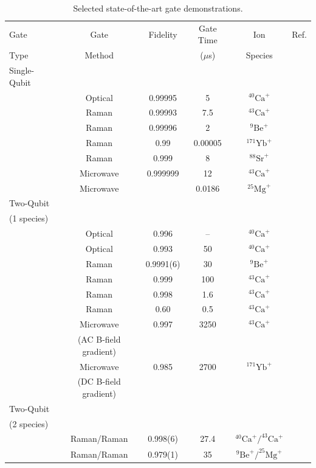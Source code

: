 \documentclass[%
reprint,
 amsmath,amssymb,
]{revtex4-1}
\begin{document}
\begin{table}
\caption{Selected state-of-the-art gate demonstrations.}
\renewcommand{\arraystretch}{1.15}
\begin{tabular}{l c c c c c}
\hline
\hline
Gate & Gate & Fidelity & Gate Time & Ion & Ref. \\
 Type & Method & & ($\mu$s) & Species \\
\hline

Single-Qubit & & &\\
 & Optical & 0.99995 & 5 &$^{40}\mathrm{Ca}^{+}$ & \cite{BermudezAssessing2017}\\
 & Raman & 0.99993  & 7.5  & $^{43}\mathrm{Ca}^{+}$ &\cite{Ballance2QubitHyperfineGate2016}\\
 & Raman & 0.99996  & 2  & $^{9}\mathrm{Be}^{+}$ & \cite{nist_gate_2016} \\
 & Raman & 0.99  & 0.00005  & $^{171}\mathrm{Yb}^{+}$ & \cite{CampbellUltrafast2010} \\
 & Raman & 0.999  & 8  & $^{88}\mathrm{Sr}^{+}$ & \cite{KeselmanZeemanQubit2011} \\
 & Microwave & 0.999999 & 12& $^{43}\mathrm{Ca}^{+}$ &\cite{HartyHighFidelityIons2014}\\
 & Microwave &  & 0.0186& $^{25}\mathrm{Mg}^{+}$& \cite{ospelkaus2011microwave}\\
Two-Qubit & & &\\
(1 species) \\
 & Optical & 0.996 & --& $^{40}\mathrm{Ca}^{+}$ & \cite{ErhardBlattCycleBench2019}\\
 & Optical & 0.993 & 50& $^{40}\mathrm{Ca}^{+}$ & \cite{BenhelmMSGate2008}\\
 & Raman & 0.9991(6) & 30 &  $^{9}\mathrm{Be}^{+}$ & \cite{nist_gate_2016} \\
 & Raman & 0.999 & 100 &  $^{43}\mathrm{Ca}^{+}$ &  \cite{Ballance2QubitHyperfineGate2016}\\
 & Raman & 0.998 & 1.6 &  $^{43}\mathrm{Ca}^{+}$ & \cite{SchaferFastIonGates2018}\\
 & Raman & 0.60 & 0.5 &  $^{43}\mathrm{Ca}^{+}$ & \cite{SchaferFastIonGates2018}\\
 & Microwave & 0.997 & 3250 &  $^{43}\mathrm{Ca}^{+}$ & \cite{HartyNearFieldMicrowaves2016}\\
& (AC B-field gradient) & \\
 & Microwave & 0.985 & 2700 & $^{171}\mathrm{Yb}^{+}$ &\cite{WeidtMicrowaveGates2017}\\
 & (DC B-field gradient) &\\
Two-Qubit & & &\\
(2 species) \\
& Raman/Raman & 0.998(6) & 27.4 &  $^{40}\mathrm{Ca}^{+}/^{43}\mathrm{Ca}^{+}$ & \cite{BallanceHybridLogic2015} \\
& Raman/Raman & 0.979(1) & 35 &  $^{9}\mathrm{Be}^{+}/^{25}\mathrm{Mg}^{+}$ & \cite{TanMultiElement2015}\\
\hline
\hline
\end{tabular}
\label{table:gateperformance}
\end{table}
\end{document}
